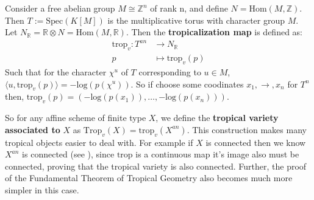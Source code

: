     Consider a free abelian group $M \cong \mathbb{Z}^n$ of rank n, and define $N = \text{Hom}(M,\mathbb{Z})$. 
    Then $T:= \text{Spec}(K[M])$ is the multiplicative torus with character group $M$. 
    Let $N_{\mathbb{R}} = \mathbb{R} \otimes N = \text{Hom}(M,\mathbb{R})$. Then the \textbf{tropicalization map} is defined as:
    \begin{align*}
        \text{trop}_v:T^{an} &\to N_{\mathbb{R}}\\
        p &\mapsto \text{trop}_v(p)
    \end{align*}
    Such that for the character $\chi^u$ of $T$ corresponding to $u \in M$, $\langle u,\text{trop}_{v}(p)\rangle = -\text{log}(p(\chi^{u}))$. So if choose some coodinates $x_1, \to, x_n$ for $T^{n}$ then, $\text{trop}_v(p) = (-\text{log}(p(x_1)), \dots,\allowbreak -\text{log}(p(x_n)))$.
    \par So for any affine scheme of finite type $X$, we define the \textbf{tropical variety associated to }$X$ as $\text{Trop}_v(X) = \text{trop}_v(X^{an})$. 
    This construction makes many tropical objects easier to deal with. 
    For example if $X$ is connected then we know $X^{an}$ is connected (see \cite{berkovich2012spectral}), since $\text{trop}$ is a continuous map it's image also must be connected, proving that the tropical variety is also connected.
    Further, the proof of the Fundamental Theorem of Tropical Geometry also becomes much more simpler in this case.
